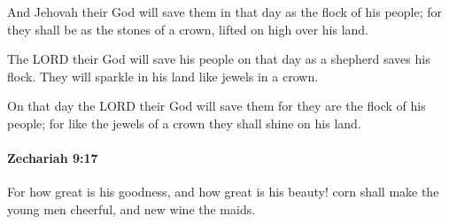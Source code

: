			\begin{versebox}
					\item[BHS] 
					\item[LXX] 
					\item[ASV] And Jehovah their God will save them in that day as the flock of his people; for they shall be as the stones of a crown, lifted on high over his land.
					\item[NIV] The LORD their God will save his people on that day as a shepherd saves his flock. They will sparkle in his land like jewels in a crown.
					\item[NRSV] On that day the LORD their God will save them for they are the flock of his people; for like the jewels of a crown they shall shine on his land.
			\end{versebox}

		\paragraph{Zechariah 9:17} %
			\label{ZECHARIAH-9-17}

			For how great is his goodness, and how great is his beauty! corn shall make the young men cheerful, and new wine the maids.


